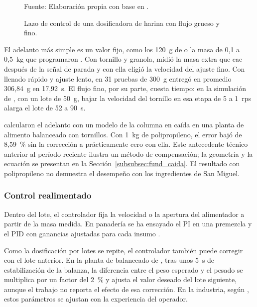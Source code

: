 \begin{figure}[H]
    \centering
    \resizebox{0.85\textwidth}{!}{}
    \caption{Lazo de control de una dosificadora de harina con flujo grueso y fino.}
    \label{fig:rumapea_lazo}
    \vspace{0.2em}
    {\footnotesize Fuente: Elaboración propia con base en
    \textcite{rumapea2026flour}.}
\end{figure}

El adelanto más simple es un valor fijo, como los 120~g de
\textcite{hadi2025weighing} o la masa de 0,1 a 0,5~kg que programaron
\textcite{bulatov2021weighing}. Con tornillo y granola,
\textcite{hidalgo2020llenado} midió la masa extra que cae después de la señal de
parada y con ella eligió la velocidad del ajuste fino. Con llenado rápido y
ajuste lento, en 31 pruebas de 300~g entregó en promedio 306,84~g en 17,92~s. El flujo fino,
por su parte, cuesta tiempo: en la simulación de \textcite{wang2025batching},
con un lote de 50~g, bajar la velocidad del tornillo en esa etapa de 5 a 1~rps
alarga el lote de 52 a 90~s.

\textcite{bukreev2014accuracy} calcularon el adelanto con un modelo de la
columna en caída en una planta de alimento balanceado con tornillos. Con
1~kg de polipropileno, el error bajó de 8,59~\% sin la corrección a
prácticamente cero con ella. Este antecedente técnico anterior al período
reciente ilustra un método de compensación; la geometría y la ecuación se
presentan en la Sección~\ref{subsubsec:fund_caida}. El resultado con
polipropileno no demuestra el desempeño con los ingredientes de San Miguel.

\subsubsection{Control realimentado}
\label{subsec:control_realimentado}

Dentro del lote, el controlador fija la velocidad o la apertura del
alimentador a partir de la masa medida. En panadería se ha ensayado el PI
en una premezcla \parencite{farihin2021premix} y el PID con ganancias
ajustadas para cada insumo \parencite{humaira2024optimalisasi}.

Como la dosificación por lotes se repite, el controlador también puede corregir
con el lote anterior. En la planta de balanceado de
\textcite{sanchez2024tolvas}, tras unos 5~s de estabilización de la balanza,
la diferencia entre el peso esperado y el pesado se multiplica por un factor
del 2~\% y ajusta el valor deseado del lote siguiente, aunque el trabajo no
reporta el efecto de esa corrección. En la industria, según
\textcite{buhler2022dosing}, estos parámetros se ajustan con la experiencia
del operador.

